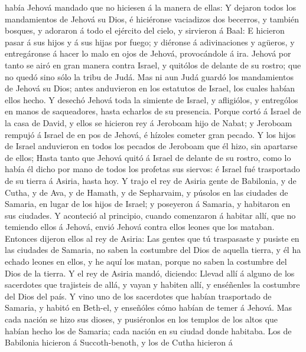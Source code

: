 había Jehová mandado que no hiciesen á la manera de ellas: 
Y dejaron todos los mandamientos de Jehová su Dios, é hiciéronse
vaciadizos dos becerros, y también bosques, y adoraron á todo el
ejército del cielo, y sirvieron á Baal:  E hicieron pasar á
sus hijos y á sus hijas por fuego; y diéronse á adivinaciones y agüeros,
y entregáronse á hacer lo malo en ojos de Jehová, provocándole á ira.
 Jehová por tanto se airó en gran manera contra Israel, y
quitólos de delante de su rostro; que no quedó sino sólo la tribu de
Judá.  Mas ni aun Judá guardó los mandamientos de Jehová su
Dios; antes anduvieron en los estatutos de Israel, los cuales habían
ellos hecho.  Y desechó Jehová toda la simiente de Israel,
y afligiólos, y entrególos en manos de saqueadores, hasta echarlos de su
presencia.  Porque cortó á Israel de la casa de David, y
ellos se hicieron rey á Jeroboam hijo de Nabat; y Jeroboam rempujó á
Israel de en pos de Jehová, é hízoles cometer gran pecado. 
Y los hijos de Israel anduvieron en todos los pecados de Jeroboam que él
hizo, sin apartarse de ellos;  Hasta tanto que Jehová quitó
á Israel de delante de su rostro, como lo había él dicho por mano de
todos los profetas sus siervos: é Israel fué trasportado de su tierra á
Asiria, hasta hoy.  Y trajo el rey de Asiria gente de
Babilonia, y de Cutha, y de Ava, y de Hamath, y de Sepharvaim, y púsolos
en las ciudades de Samaria, en lugar de los hijos de Israel; y poseyeron
á Samaria, y habitaron en sus ciudades.  Y aconteció al
principio, cuando comenzaron á habitar allí, que no temiendo ellos á
Jehová, envió Jehová contra ellos leones que los mataban. 
Entonces dijeron ellos al rey de Asiria: Las gentes que tú traspasaste y
pusiste en las ciudades de Samaria, no saben la costumbre del Dios de
aquella tierra, y él ha echado leones en ellos, y he aquí los matan,
porque no saben la costumbre del Dios de la tierra.  Y el
rey de Asiria mandó, diciendo: Llevad allí á alguno de los sacerdotes
que trajisteis de allá, y vayan y habiten allí, y enséñenles la
costumbre del Dios del país.  Y vino uno de los sacerdotes
que habían trasportado de Samaria, y habitó en Beth-el, y enseñóles cómo
habían de temer á Jehová.  Mas cada nación se hizo sus
dioses, y pusiéronlos en los templos de los altos que habían hecho los
de Samaria; cada nación en su ciudad donde habitaba.  Los
de Babilonia hicieron á Succoth-benoth, y los de Cutha hicieron á
